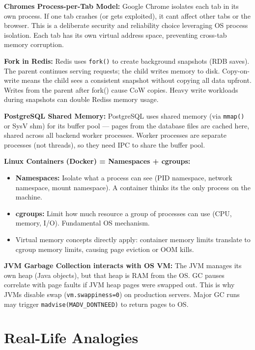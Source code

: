 \documentclass[11pt]{article}
\providecommand{\tightlist}{\setlength{\itemsep}{1pt}\setlength{\parskip}{0pt}}
\begin{document}
\textbf{Chrome\textquotesingle s Process-per-Tab Model:} Google Chrome isolates each tab in its own process. If one tab crashes (or gets exploited), it can\textquotesingle t affect other tabs or the browser. This is a deliberate security and reliability choice leveraging OS process isolation. Each tab has its own virtual address space, preventing cross-tab memory corruption.

\textbf{Fork in Redis:} Redis uses \texttt{fork()} to create background snapshots (RDB saves). The parent continues serving requests; the child writes memory to disk. Copy-on-write means the child sees a consistent snapshot without copying all data upfront. Writes from the parent after fork() cause CoW copies. Heavy write workloads during snapshots can double Redis\textquotesingle s memory usage.

\textbf{PostgreSQL Shared Memory:} PostgreSQL uses shared memory (via \texttt{mmap()} or SysV shm) for its buffer pool --- pages from the database files are cached here, shared across all backend worker processes. Worker processes are separate processes (not threads), so they need IPC to share the buffer pool.

\textbf{Linux Containers (Docker) = Namespaces + cgroups:}

\begin{itemize}
\tightlist
\item
  \textbf{Namespaces:} Isolate what a process can see (PID namespace, network namespace, mount namespace). A container thinks it\textquotesingle s the only process on the machine.
\item
  \textbf{cgroups:} Limit how much resource a group of processes can use (CPU, memory, I/O). Fundamental OS mechanism.
\item
  Virtual memory concepts directly apply: container memory limits translate to cgroup memory limits, causing page eviction or OOM kills.
\end{itemize}

\textbf{JVM Garbage Collection interacts with OS VM:} The JVM manages its own heap (Java objects), but that heap is RAM from the OS. GC pauses correlate with page faults if JVM heap pages were swapped out. This is why JVMs disable swap (\texttt{vm.swappiness=0}) on production servers. Major GC runs may trigger \texttt{madvise(MADV\_DONTNEED)} to return pages to OS.

\section{Real-Life Analogies}\label{real-life-analogies}
\end{document}
